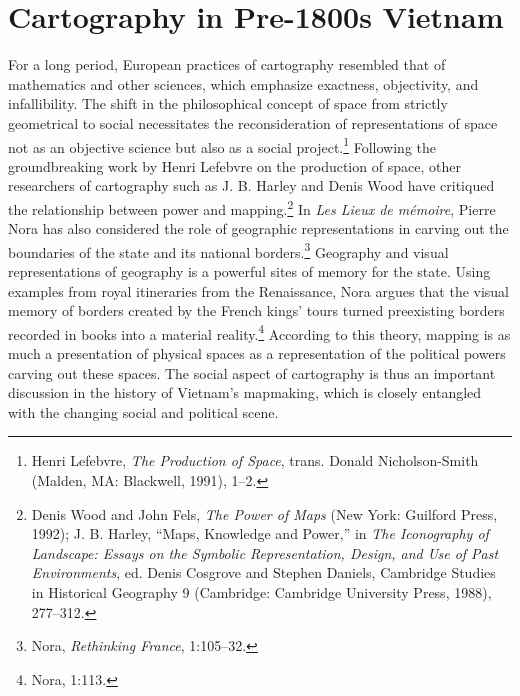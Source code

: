 
\section{Cartography in Pre-1800s Vietnam}\label{sec:historiography} %
For a long period, European practices of cartography resembled that of mathematics and other sciences, which emphasize exactness, objectivity, and infallibility. The shift in the philosophical concept of space from strictly geometrical to social necessitates the reconsideration of representations of space not as an objective science but also as a social project.\footnote{Henri Lefebvre, \textit{The Production of Space}, trans. Donald Nicholson-Smith (Malden, MA: Blackwell, 1991), 1–2.}  Following the groundbreaking work by Henri Lefebvre on the production of space, other researchers of cartography such as J. B. Harley and Denis Wood have critiqued the relationship between power and mapping.\footnote{Denis Wood and John Fels, \textit{The Power of Maps} (New York: Guilford Press, 1992); J. B. Harley, “Maps, Knowledge and Power,” in \textit{The Iconography of Landscape: Essays on the Symbolic Representation, Design, and Use of Past Environments}, ed. Denis Cosgrove and Stephen Daniels, Cambridge Studies in Historical Geography 9 (Cambridge: Cambridge University Press, 1988), 277–312.}  In \textit{Les Lieux de mémoire}, Pierre Nora has also considered the role of geographic representations in carving out the boundaries of the state and its national borders.\footnote{Nora, \textit{Rethinking France}, 1:105–32.} Geography and visual representations of geography is a powerful sites of memory for the state. Using examples from royal itineraries from the Renaissance, Nora argues that the visual memory of borders created by the French kings’ tours turned preexisting borders recorded in books into a material reality.\footnote{Nora, 1:113.} According to this theory, mapping is as much a presentation of physical spaces as a representation of the political powers carving out these spaces. The social aspect of cartography is thus an important discussion in the history of Vietnam’s mapmaking, which is closely entangled with the changing social and political scene.

